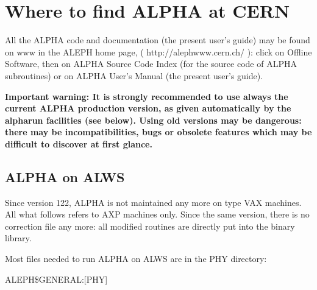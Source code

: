 \chapter{\label{sec-ZB}Where to find ALPHA at CERN}
 
All the ALPHA code and documentation (the present user's guide) may be found on www in the ALEPH home page,
( http://alephwww.cern.ch/ ):
click on Offline Software, then on ALPHA Source Code Index (for the source code of ALPHA subroutines) or on
ALPHA User's Manual (the present user's guide).
 
{\bf Important warning: It is strongly recommended to use always the current ALPHA production version, as given
automatically by the alpharun facilities (see below). Using old versions may be dangerous: there may be incompatibilities, bugs
or obsolete features which may be difficult to discover at first glance.}  


 
 
\section{\label{sec-ONVAX}ALPHA on ALWS}
 
Since version 122, ALPHA is not maintained any more on type VAX machines. All what follows refers to AXP machines only.
Since the same version, there is no correction file any more: all modified routines are directly put into the binary library.
 
Most files needed to run ALPHA on ALWS are in the PHY directory:
 
ALEPH\$GENERAL:[PHY]
 
